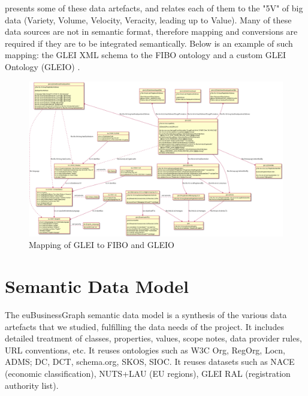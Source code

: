 \documentclass[runningheads,a4paper]{llncs}
\makeatletter
\def\maxwidth#1{\ifdim\Gin@nat@width>#1 #1\else\Gin@nat@width\fi}
\makeatother
\begin{document}
 \cite{_Ref491191838} presents some of these data artefacts, and relates each of them to the "5V" of big data (Variety, Volume, Velocity, Veracity, leading up to Value). Many of these data sources are not in semantic format, therefore mapping and conversions are required if they are to be integrated semantically. Below is an example of such mapping: the GLEI XML schema to the FIBO ontology and a custom GLEI Ontology (GLEIO)  \cite{_Ref491193086}.
\begin{figure}[h!]
\centering
\includegraphics[width=\maxwidth{\textwidth}]{img/10000000000007EF000004DB2899AFE905260A79.png}
\cprotect\caption{Mapping of GLEI to FIBO and GLEIO}
\label{}
\end{figure}


\section{Semantic Data Model}

The euBusinessGraph semantic data model  \cite{_Ref491194758} is a synthesis of the various data artefacts that we studied, fulfilling the data needs of the project. It includes detailed treatment of classes, properties, values, scope notes, data provider rules, URL conventions, etc. It reuses ontologies such as W3C Org, RegOrg, Locn, ADMS; DC, DCT, schema.org, SKOS, SIOC. It reuses datasets such as NACE (economic classification), NUTS+LAU (EU regions), GLEI RAL (registration authority list). 
\end{document}
